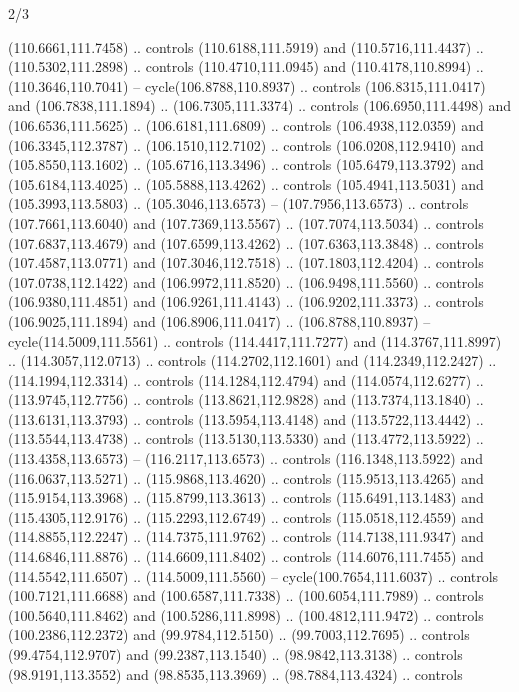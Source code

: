 \begin{flagdescription}{2/3}
\begin{scope}[shift={(0.5\flaglength,0.5)},scale=\flagwidth/320]
\begin{scope}[y=0.8pt, x=0.8pt, yscale=-1,shift={(-118.3,-146)}]
  (110.6661,111.7458) .. controls (110.6188,111.5919) and (110.5716,111.4437) ..
  (110.5302,111.2898) .. controls (110.4710,111.0945) and (110.4178,110.8994) ..
  (110.3646,110.7041) -- cycle(106.8788,110.8937) .. controls
  (106.8315,111.0417) and (106.7838,111.1894) .. (106.7305,111.3374) .. controls
  (106.6950,111.4498) and (106.6536,111.5625) .. (106.6181,111.6809) .. controls
  (106.4938,112.0359) and (106.3345,112.3787) .. (106.1510,112.7102) .. controls
  (106.0208,112.9410) and (105.8550,113.1602) .. (105.6716,113.3496) .. controls
  (105.6479,113.3792) and (105.6184,113.4025) .. (105.5888,113.4262) .. controls
  (105.4941,113.5031) and (105.3993,113.5803) .. (105.3046,113.6573) --
  (107.7956,113.6573) .. controls (107.7661,113.6040) and (107.7369,113.5567) ..
  (107.7074,113.5034) .. controls (107.6837,113.4679) and (107.6599,113.4262) ..
  (107.6363,113.3848) .. controls (107.4587,113.0771) and (107.3046,112.7518) ..
  (107.1803,112.4204) .. controls (107.0738,112.1422) and (106.9972,111.8520) ..
  (106.9498,111.5560) .. controls (106.9380,111.4851) and (106.9261,111.4143) ..
  (106.9202,111.3373) .. controls (106.9025,111.1894) and (106.8906,111.0417) ..
  (106.8788,110.8937) -- cycle(114.5009,111.5561) .. controls
  (114.4417,111.7277) and (114.3767,111.8997) .. (114.3057,112.0713) .. controls
  (114.2702,112.1601) and (114.2349,112.2427) .. (114.1994,112.3314) .. controls
  (114.1284,112.4794) and (114.0574,112.6277) .. (113.9745,112.7756) .. controls
  (113.8621,112.9828) and (113.7374,113.1840) .. (113.6131,113.3793) .. controls
  (113.5954,113.4148) and (113.5722,113.4442) .. (113.5544,113.4738) .. controls
  (113.5130,113.5330) and (113.4772,113.5922) .. (113.4358,113.6573) --
  (116.2117,113.6573) .. controls (116.1348,113.5922) and (116.0637,113.5271) ..
  (115.9868,113.4620) .. controls (115.9513,113.4265) and (115.9154,113.3968) ..
  (115.8799,113.3613) .. controls (115.6491,113.1483) and (115.4305,112.9176) ..
  (115.2293,112.6749) .. controls (115.0518,112.4559) and (114.8855,112.2247) ..
  (114.7375,111.9762) .. controls (114.7138,111.9347) and (114.6846,111.8876) ..
  (114.6609,111.8402) .. controls (114.6076,111.7455) and (114.5542,111.6507) ..
  (114.5009,111.5560) -- cycle(100.7654,111.6037) .. controls
  (100.7121,111.6688) and (100.6587,111.7338) .. (100.6054,111.7989) .. controls
  (100.5640,111.8462) and (100.5286,111.8998) .. (100.4812,111.9472) .. controls
  (100.2386,112.2372) and (99.9784,112.5150) .. (99.7003,112.7695) .. controls
  (99.4754,112.9707) and (99.2387,113.1540) .. (98.9842,113.3138) .. controls
  (98.9191,113.3552) and (98.8535,113.3969) .. (98.7884,113.4324) .. controls

\end{scope}
\end{scope}
\end{flagdescription}
